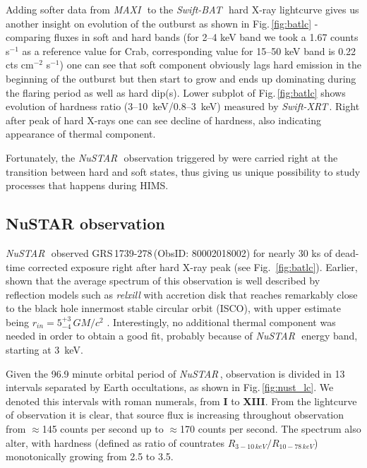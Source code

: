 \documentclass[a4paper,fleqn,usenatbib]{mnras}
\def\grs{{GRS\,1739-278\,}}
\def\swiftx{{\em Swift-XRT\,}}
\def\swiftb{{\em Swift-BAT\,}}
\def\nustar{{\em NuSTAR\,}}
\def\maxi{{\em MAXI\,}}
\begin{document}
Adding softer data from \maxi\, to the \swiftb\, hard X-ray lightcurve gives us another insight on evolution of the outburst as shown in Fig.\,\ref{fig:batlc} - comparing fluxes in soft and hard bands (for 2--4 keV band we took a 1.67 counts s$^{-1}$ as a reference value for Crab, corresponding value for 15--50 keV band is 0.22 cts cm$^{-2}$ s$^{-1}$) one can see that soft component obviously lags hard emission in the beginning of the outburst but then start to grow and ends up dominating during the flaring period as well as hard dip(s). Lower subplot of Fig.\,\ref{fig:batlc} shows evolution of hardness ratio (3--10~keV/0.8--3~keV) measured by \swiftx. Right after peak of hard X-rays one can see decline of hardness, also indicating appearance of thermal component.

Fortunately, the \nustar\, observation triggered by \cite{miller15_nust} were carried right at the transition between hard and soft states, thus giving us unique possibility to study processes that happens during HIMS. 

\subsection{NuSTAR observation}
\label{sec:nust} 

\nustar\, observed \grs (ObsID: 80002018002) for nearly 30 ks of dead-time corrected exposure right after hard X-ray peak (see Fig.~\ref{fig:batlc}). Earlier, \cite{miller15_nust} shown that the average spectrum of this observation is well described by reflection models such as {\it relxill} \citep{garcia14, dauser14,dauser16} with accretion disk that reaches remarkably close to the black hole innermost stable circular orbit (ISCO), with upper estimate being $r_{in} = 5^{+3}_{-4}\, G M/c^{2}$ \citep{miller15_nust}. Interestingly, no additional thermal component was needed in order to obtain a good fit, probably because of \nustar\, energy band, starting at 3~keV. 

Given the 96.9 minute orbital period of \nustar, observation is divided in 13 intervals separated by Earth occultations, as shown in Fig.\,\ref{fig:nust_lc}. We denoted this intervals with roman numerals, from {\bf I} to {\bf XIII}. From the lightcurve of observation it is clear, that source flux is increasing throughout observation from $\approx$145 counts per second up to $\approx$170 counts per second. 
The spectrum also alter, with hardness (defined as ratio of countrates  $R_{3-10\,keV}/R_{10-78\,keV}$) monotonically growing from 2.5 to 3.5. 
\end{document}
